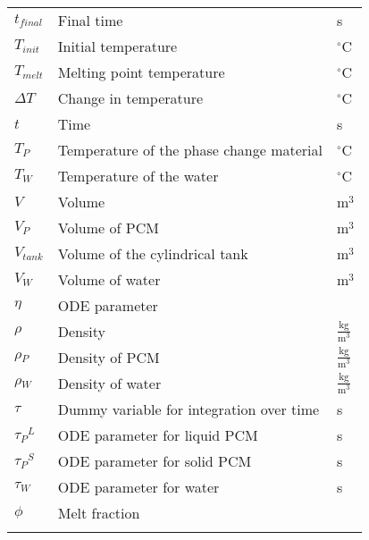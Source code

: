\documentclass[12pt]{article}
\begin{document}
\begin{longtabu}{l X[l] l}
${t_{final}}$ & Final time & s
\\
${T_{init}}$ & Initial temperature & ${}^{\circ}$C
\\
${T_{melt}}$ & Melting point temperature & ${}^{\circ}$C
\\
$\Delta{}T$ & Change in temperature & ${}^{\circ}$C
\\
$t$ & Time & s
\\
${T_{P}}$ & Temperature of the phase change material & ${}^{\circ}$C
\\
${T_{W}}$ & Temperature of the water & ${}^{\circ}$C
\\
$V$ & Volume & $\text{m}^{3}$
\\
${V_{P}}$ & Volume of PCM & $\text{m}^{3}$
\\
${V_{tank}}$ & Volume of the cylindrical tank & $\text{m}^{3}$
\\
${V_{W}}$ & Volume of water & $\text{m}^{3}$
\\
$\eta{}$ & ODE parameter & 
\\
$\rho{}$ & Density & $\frac{\text{kg}}{\text{m}^{3}}$
\\
${\rho{}_{P}}$ & Density of PCM & $\frac{\text{kg}}{\text{m}^{3}}$
\\
${\rho{}_{W}}$ & Density of water & $\frac{\text{kg}}{\text{m}^{3}}$
\\
$\tau{}$ & Dummy variable for integration over time & s
\\
${{\tau{}_{P}}^{L}}$ & ODE parameter for liquid PCM & s
\\
${{\tau{}_{P}}^{S}}$ & ODE parameter for solid PCM & s
\\
${\tau{}_{W}}$ & ODE parameter for water & s
\\
$\phi{}$ & Melt fraction & 
\\
\bottomrule
\label{Table:ToS}
\end{longtabu}
\end{document}
